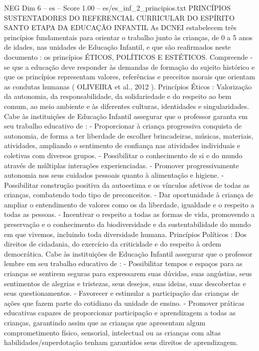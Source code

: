 \begin{textsample}{NEG Dim 6 – es – Score 1.00 – es/es\_inf\_2\_principios.txt}  \label{ex:f6_neg_146}
PRINCÍPIOS SUSTENTADORES DO REFERENCIAL CURRICULAR DO ESPÍRITO SANTO ETAPA DA EDUCAÇÃO INFANTIL As DCNEI estabelecem três princípios fundamentais para orientar o trabalho junto às crianças, de 0 a 5 anos de idades, nas unidades de Educação Infantil, e que são reafirmados neste documento : os princípios ÉTICOS, POLÍTICOS E ESTÉTICOS.
Compreende -se que a educação deve responder às demandas de formação do sujeito histórico e que os princípios representam valores, referências e preceitos morais que orientam as condutas humanas ( OLIVEIRA et al., 2012 ).
Princípios Éticos : Valorização da autonomia, da responsabilidade, da solidariedade e do respeito ao bem comum, ao meio ambiente e às diferentes culturas, identidades e singularidades.
Cabe às instituições de Educação Infantil assegurar que o professor garanta em seu trabalho educativo de : - Proporcionar à criança progressiva conquista de autonomia, de forma a ter liberdade de escolher brincadeiras, músicas, materiais, atividades, ampliando o sentimento de confiança nas atividades individuais e coletivas com diversos grupos. - Possibilitar o conhecimento de si e do mundo através de múltiplas interações experienciadas. - Promover progressivamente autonomia nos seus cuidados pessoais quanto à alimentação e higiene. - Possibilitar construção positiva da autoestima e os vínculos afetivos de todas as crianças, combatendo todo tipo de preconceitos. - Dar oportunidade à criança de ampliar o entendimento de valores como os da liberdade, igualdade e o respeito a todas as pessoas. - Incentivar o respeito a todas as formas de vida, promovendo a preservação e o conhecimento da biodiversidade e da sustentabilidade do mundo em que vivemos, incluindo toda diversidade humana.
Princípios Políticos : Dos direitos de cidadania, do exercício da criticidade e do respeito à ordem democrática.
Cabe às instituições de Educação Infantil assegurar que o professor lembre em seu trabalho educativo de : - Possibilitar tempos e espaços para as crianças se sentirem seguras para expressarem suas dúvidas, suas angústias, seus sentimentos de alegrias e tristezas, seus desejos, suas ideias, suas descobertas e seus questionamentos. - Favorecer e estimular a participação das crianças de ações que fazem parte do cotidiano da unidade de ensino. - Promover práticas educativas capazes de proporcionar participação e aprendizagem a todas as crianças, garantindo assim que as crianças que apresentam algum comprometimento físico, sensorial, intelectual ou as crianças com altas habilidades/superdotação tenham garantidos seus direitos de aprendizagem.

\end{textsample}
